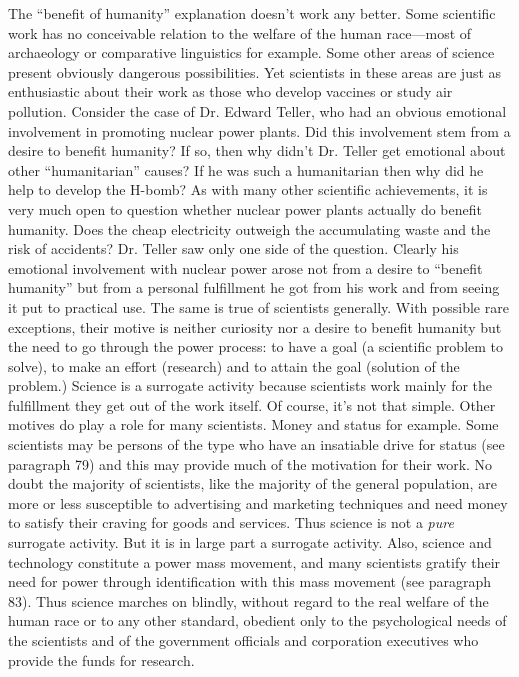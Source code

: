  The “benefit of humanity” explanation doesn’t work any better. Some scientific work has no conceivable relation to the welfare of the human race—most of archaeology or comparative linguistics for example. Some other areas of science present obviously dangerous possibilities. Yet scientists in these areas are just as enthusiastic about their work as those who develop vaccines or study air pollution. Consider the case of Dr. Edward Teller, who had an obvious emotional involvement in promoting nuclear power plants. Did this involvement stem from a desire to benefit humanity? If so, then why didn’t Dr. Teller get emotional about other “humanitarian” causes? If he was such a humanitarian then why did he help to develop the H-bomb? As with many other scientific achievements, it is very much open to question whether nuclear power plants actually do benefit humanity. Does the cheap electricity outweigh the accumulating waste and the risk of accidents? Dr. Teller saw only one side of the question. Clearly his emotional involvement with nuclear power arose not from a desire to “benefit humanity” but from a personal fulfillment he got from his work and from seeing it put to practical use.
 The same is true of scientists generally. With possible rare exceptions, their motive is neither curiosity nor a desire to benefit humanity but the need to go through the power process: to have a goal (a scientific problem to solve), to make an effort (research) and to attain the goal (solution of the problem.) Science is a surrogate activity because scientists work mainly for the fulfillment they get out of the work itself.
 Of course, it’s not that simple. Other motives do play a role for many scientists. Money and status for example. Some scientists may be persons of the type who have an insatiable drive for status (see paragraph 79) and this may provide much of the motivation for their work. No doubt the majority of scientists, like the majority of the general population, are more or less susceptible to advertising and marketing techniques and need money to satisfy their craving for goods and services. Thus science is not a {\em pure} surrogate activity. But it is in large part a surrogate activity.
 Also, science and technology constitute a power mass movement, and many scientists gratify their need for power through identification with this mass movement (see paragraph 83).
 Thus science marches on blindly, without regard to the real welfare of the human race or to any other standard, obedient only to the psychological needs of the scientists and of the government officials and corporation executives who provide the funds for research.

